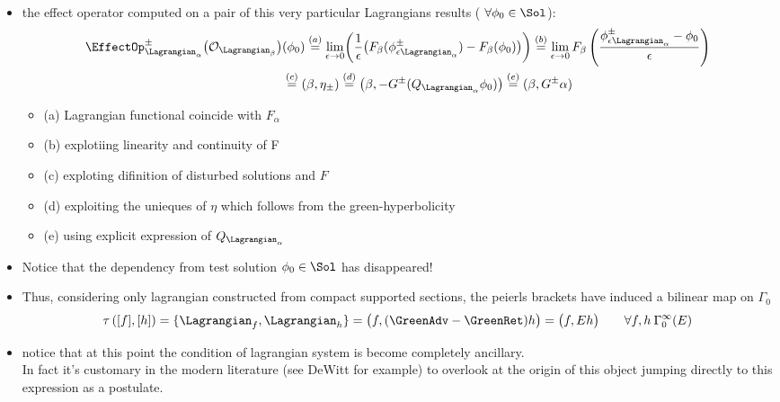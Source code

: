\documentclass[a4paper,11pt]{scrartcl}
\begin{document}
\begin{itemize}
        \item the effect operator computed on a pair of this very particular Lagrangians results ( $\forall     \phi_0\in \Sol$):
        \begin{align}
            \EffectOp_{\Lagrangian_\alpha}^\pm \big( \mathcal{O}_{\Lagrangian_\beta} \big)& (\phi_0) 
            \stackrel{(a)}{=}
             \lim_{\epsilon \rightarrow 0} \biggr( \frac{1}{\epsilon}\big(F_\beta ( \phi_{\epsilon \Lagrangian_\alpha}^\pm) - F_\beta(\phi_0) \big) \biggr) 
            \stackrel{(b)}{=}
            \lim_{\epsilon \rightarrow 0} F_\beta\left( \frac{ \phi_{\epsilon \Lagrangian_\alpha}^\pm- \phi_0}{\epsilon} \right)  
                        \nonumber\\
            &\stackrel{(c)}{=} (\beta, \eta_\pm) 
                \stackrel{(d)}{=} \big( \beta, - G^\pm (Q_{\Lagrangian_\alpha} \phi_0 ) \big) 
                \stackrel{(e)}{=} ( \beta, G^\pm \alpha) \nonumber
        \end{align}
        \begin{footnotesize}\begin{itemize}
            \item    (a) Lagrangian functional coincide with $F_\alpha$
            \item (b) explotiing linearity and continuity of F
            \item (c) exploting difinition of disturbed solutions and $F$
            \item (d) exploiting the unieques of $\eta$ which follows from the green-hyperbolicity
            \item (e) using explicit expression of $Q_{\Lagrangian_\alpha}$
        \end{itemize}\end{footnotesize}
        \item Notice that the dependency from test solution $\phi_0 \in \Sol$ has disappeared!
        \item Thus, considering only lagrangian constructed from compact supported sections, the peierls brackets have induced a bilinear map on $\Gamma_0$
        $$                             \tau\left( [f] , [h]\right) = \{\Lagrangian_f , \Lagrangian_h\} = \big( f , (\GreenAdv - \GreenRet)h \big) = \big(f, E h\big) \qquad \forall f,h \: \Gamma_0^\infty (E)$$
        \item notice that at this point the condition of lagrangian system is become completely ancillary.\\
        In fact it's customary in the modern literature (see DeWitt for example) to overlook at the origin of this object jumping directly to this expression as a postulate.

\end{itemize}
\end{document}
